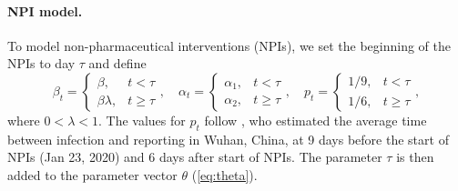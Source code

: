 \documentclass[12pt]{extarticle}
\begin{document}
\paragraph*{NPI model.}
To model non-pharmaceutical interventions (NPIs), we set the beginning of the NPIs to day $\tau$ and define
\begin{equation} \label{eq:NPI_model}
\beta_t = \begin{cases} 
  \beta, & t < \tau \\ %
  \beta \lambda, & t \ge \tau
\end{cases},
\quad
\alpha_t = \begin{cases} 
  \alpha_1, & t < \tau \\ %
  \alpha_2, & t \ge \tau
\end{cases},
\quad
p_t = \begin{cases} 
  1/9, & t < \tau \\ %
  1/6, & t \ge \tau
\end{cases},
\end{equation}
where $0 < \lambda < 1$.
The values for $p_t$ follow \citet{Li2020}, who estimated the average time between infection and reporting in Wuhan, China, at 9 days before the start of NPIs (Jan 23, 2020) and 6 days after start of NPIs.
The parameter $\tau$ is then added to the parameter vector $\theta$ (\autoref{eq:theta}).

\end{document}
